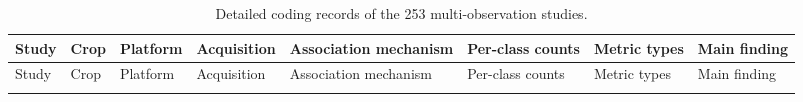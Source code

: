 \begin{footnotesize}
\setlength{\tabcolsep}{3pt}
\begin{longtable}{@{}L{2.5cm}L{1.3cm}L{1.6cm}L{1.4cm}L{2.2cm}L{0.9cm}L{1.5cm}L{\dimexpr\linewidth-11.4cm-14\tabcolsep\relax}@{}}
\caption{Detailed coding records of the 253 multi-observation studies.}\label{tab:c1matrix}\\
\toprule
Study & Crop & Platform & Acquisition & Association mechanism & Per-class counts & Metric types & Main finding\\
\midrule
\endfirsthead
\toprule
Study & Crop & Platform & Acquisition & Association mechanism & Per-class counts & Metric types & Main finding\\
\midrule
\endhead
\bottomrule
\endfoot
\bottomrule

\end{longtable}
\end{footnotesize}
